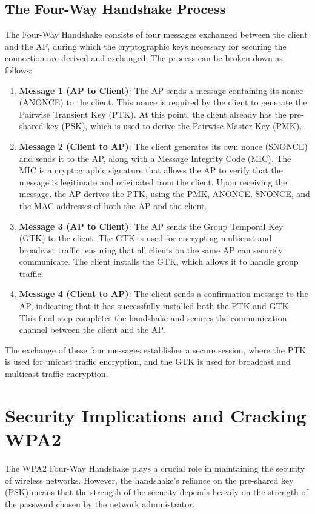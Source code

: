 \subsection{The Four-Way Handshake Process}
The Four-Way Handshake consists of four messages exchanged between the client and the AP, during which the cryptographic keys necessary for securing the connection are derived and exchanged. The process can be broken down as follows:

\begin{enumerate}
    \item \textbf{Message 1 (AP to Client)}: The AP sends a message containing its nonce (ANONCE) to the client. This nonce is required by the client to generate the Pairwise Transient Key (PTK). At this point, the client already has the pre-shared key (PSK), which is used to derive the Pairwise Master Key (PMK).
    
    \item \textbf{Message 2 (Client to AP)}: The client generates its own nonce (SNONCE) and sends it to the AP, along with a Message Integrity Code (MIC). The MIC is a cryptographic signature that allows the AP to verify that the message is legitimate and originated from the client. Upon receiving the message, the AP derives the PTK, using the PMK, ANONCE, SNONCE, and the MAC addresses of both the AP and the client.
    
    \item \textbf{Message 3 (AP to Client)}: The AP sends the Group Temporal Key (GTK) to the client. The GTK is used for encrypting multicast and broadcast traffic, ensuring that all clients on the same AP can securely communicate. The client installs the GTK, which allows it to handle group traffic.
    
    \item \textbf{Message 4 (Client to AP)}: The client sends a confirmation message to the AP, indicating that it has successfully installed both the PTK and GTK. This final step completes the handshake and secures the communication channel between the client and the AP.
\end{enumerate}

The exchange of these four messages establishes a secure session, where the PTK is used for unicast traffic encryption, and the GTK is used for broadcast and multicast traffic encryption.

\section{Security Implications and Cracking WPA2}
The WPA2 Four-Way Handshake plays a crucial role in maintaining the security of wireless networks. However, the handshake's reliance on the pre-shared key (PSK) means that the strength of the security depends heavily on the strength of the password chosen by the network administrator. 


